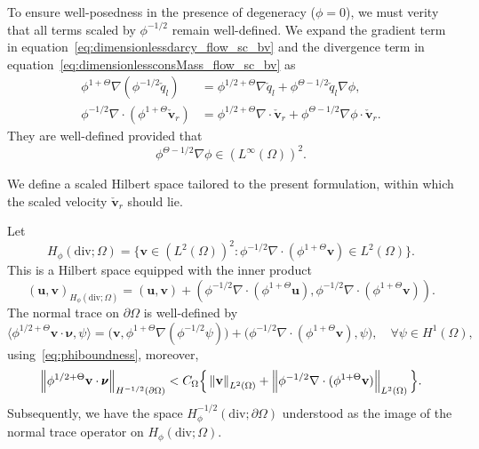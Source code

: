 To ensure well-posedness in the presence of degeneracy ($\phi=0$), we must verity that 
all terms scaled by $\phi^{-1/2}$ remain well-defined.
We expand the gradient term in equation~\eqref{eq:dimensionlessdarcy_flow_sc_bv}
and the divergence term in equation~\eqref{eq:dimensionlessconsMass_flow_sc_bv} as
\begin{equation}
		  \begin{aligned}
					 \phi^{1+\Theta} \nabla (\phi^{-1/2} \check{q}_l) &= \phi^{1/2+\Theta} \nabla \check{q}_l +  \phi^{\Theta-1/2} \check{q}_l \nabla \phi, \\
					 \phi^{-1/2} \nabla \cdot (\phi^{1+\Theta} \check{\mathbf{v}}_r) &=
					 \phi^{1/2+\Theta} \nabla \cdot \check{\mathbf{v}}_r + 
					 \phi^{\Theta - 1/2} \nabla \phi \cdot \check{\mathbf{v}}_r.
		  \end{aligned}
\end{equation}
They are well-defined provided that
\begin{equation}\label{eq:phiboundness}
		  \phi^{\Theta - 1/2} \nabla \phi \in (L^{\infty}(\Omega))^2.
\end{equation}

We define a scaled Hilbert space tailored to the present formulation, within which
the scaled velocity $\check{\mathbf{v}}_r$ should lie.
\begin{defn}
Let
\begin{equation}\label{eq:scaledHspace}
		  H_{\phi}(\text{div}; \Omega) = \Big\{ \mathbf{v} 
		  \in (L^2(\Omega))^2: \phi^{-1/2}\nabla \cdot (\phi^{1+\Theta} \mathbf{v})
		  \in L^2(\Omega) \Big\}.
\end{equation}
This is a Hilbert space equipped with the inner product
\begin{equation}\label{eq:scaledinnerp}
		  (\mathbf{u}, \mathbf{v})_{H_\phi(\text{div};\Omega)} = 
		  (\mathbf{u}, \mathbf{v}) + 
		  (\phi^{-1/2} \nabla \cdot (\phi^{1+\Theta}\mathbf{u}), \phi^{-1/2} \nabla \cdot (\phi^{1+\Theta}\mathbf{v})).
\end{equation}
The normal trace on $\partial \Omega$ is well-defined by
		  \begin{equation}\label{eq:scaledtraceoperator}
		  \langle \phi^{1/2+\Theta} \mathbf{v}\cdot \pmb{\nu}, \psi \rangle = \big(\mathbf{v}, \phi^{1+\Theta}\nabla(\phi^{-1/2}\psi)\big) + 
		  \big(\phi^{-1/2}\nabla \cdot (\phi^{1+\Theta}\mathbf{v}),\psi \big), \quad \forall \psi \in H^1(\Omega),
\end{equation}
		  using~\eqref{eq:phiboundness}, moreover,
\begin{equation}\label{eq:tracescaled}
		  \left\lVert\phi^{1/2+\Theta}\mathbf{v}\cdot \pmb{\nu}\right\rVert_{H^{-1/2}(\partial \Omega)} < C_{\Omega} \Big\{ \left\lVert\mathbf{v}\right\rVert_{L^2(\Omega)} + \left\lVert\phi^{-1/2}\nabla \cdot (\phi^{1+\Theta}\mathbf{v})\right\rVert_{L^2(\Omega)} \Big\}.
\end{equation}
 Subsequently, we have the space $H_\phi^{-1/2}(\text{div};\partial \Omega)$ understood as the image of the normal trace operator on $H_\phi(\text{div};\Omega)$.
\end{defn}
